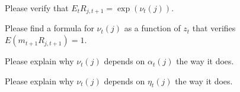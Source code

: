 \medskip
{}  Please verify that $E_t R_{j,t+1} = \exp(\nu_t(j))$.

\medskip

 Please find a formula for
$\nu_t(j) $ as a function of $z_t$ that verifies $E (m_{t+1} R_{j,t+1})=1$.

\medskip
{}  Please explain why $\nu_t(j)$ depends on $\alpha_t(j)$ the way it does.

\medskip
{} Please explain why $\nu_t(j)$ depends on $\eta_t(j)$ the way it does.




